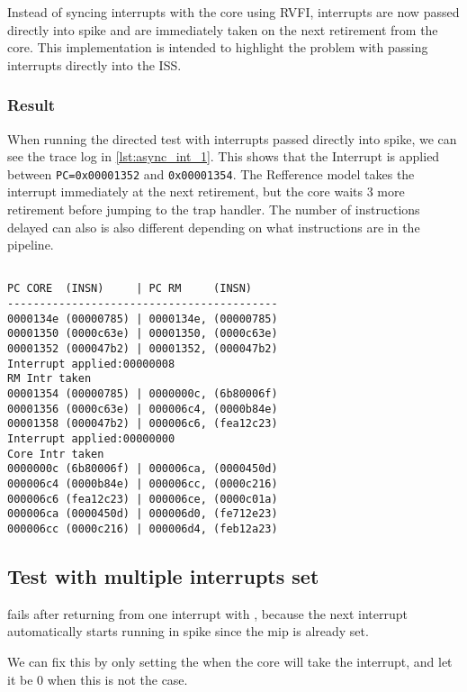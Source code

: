 Instead of syncing interrupts with the core using RVFI, interrupts are now passed directly into spike and are immediately taken on the next retirement from the core. This implementation is intended to highlight the problem with passing interrupts directly into the ISS.

\subsubsection{Result}

When running the directed test with interrupts passed directly into spike, we can see the trace log in \cref{lst:async_int_1}. This shows that the Interrupt is applied between \lstinline{PC=0x00001352} and \lstinline{0x00001354}. The Refference model takes the interrupt immediately at the next retirement, but the core waits 3 more retirement before jumping to the trap handler. The number of instructions delayed can also is also different depending on what instructions are in the pipeline.

\begin{lstlisting}[label={lst:async_int_1},caption={Trace output from asynchronous interrupts without pipeline shell}]

PC CORE  (INSN)     | PC RM     (INSN)
------------------------------------------
0000134e (00000785) | 0000134e, (00000785) 
00001350 (0000c63e) | 00001350, (0000c63e) 
00001352 (000047b2) | 00001352, (000047b2) 
Interrupt applied:00000008
RM Intr taken
00001354 (00000785) | 0000000c, (6b80006f) 
00001356 (0000c63e) | 000006c4, (0000b84e) 
00001358 (000047b2) | 000006c6, (fea12c23) 
Interrupt applied:00000000
Core Intr taken
0000000c (6b80006f) | 000006ca, (0000450d) 
000006c4 (0000b84e) | 000006cc, (0000c216) 
000006c6 (fea12c23) | 000006ce, (0000c01a) 
000006ca (0000450d) | 000006d0, (fe712e23) 
000006cc (0000c216) | 000006d4, (feb12a23) 
\end{lstlisting}


\subsection{Test with multiple interrupts set}

 fails after returning from one interrupt with , because the next interrupt automatically starts running in spike since the mip is already set.

We can fix this by only setting the  when the core will take the interrupt, and let it be 0 when this is not the case.

